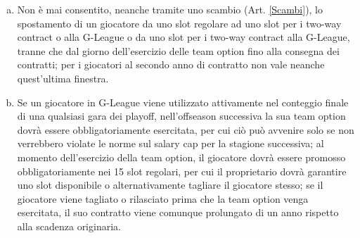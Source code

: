 \documentclass{article}
\begin{document}
\begin{enumerate}[(a)]
\item Non è mai consentito, neanche tramite uno scambio (Art. \ref{Scambi}), lo spostamento di un giocatore da uno slot regolare ad uno slot per i two-way contract o alla G-League o da uno slot per i two-way contract alla G-League, tranne che dal giorno dell'esercizio delle team option fino alla consegna dei contratti; per i giocatori al secondo anno di contratto non vale neanche quest'ultima finestra.
\item Se un giocatore in G-League viene utilizzato attivamente nel conteggio finale di una qualsiasi gara dei playoff, nell'offseason successiva la sua team option dovrà essere obbligatoriamente esercitata, per cui ciò può avvenire solo se non verrebbero violate le norme sul salary cap per la stagione successiva; al momento dell'esercizio della team option, il giocatore dovrà essere promosso obbligatoriamente nei 15 slot regolari, per cui il proprietario dovrà garantire uno slot disponibile o alternativamente tagliare il giocatore stesso; se il giocatore viene tagliato o rilasciato prima che la team option venga esercitata, il suo contratto viene comunque prolungato di un anno rispetto alla scadenza originaria. 
\end{enumerate}
\end{document}
